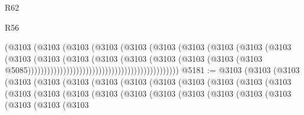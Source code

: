 \begin{lexlean}{R62}
\begin{lexlean}{R56}
\begin{coremodule}
{{{{{{{{{{{{{{{{{{{{{{{{{{{{{{{{{{{{{{{{{{{{{{{{{{{{{{{{{{{{{{{{{{{{{{{{{{{{{{{{{{{{{{{{{{{{{{{{{{{{{{{{{{{{{{{{{{{{{{{{{{{{{{{{{{{{{{{{{{{{{{{{{{{{{{{{{{{{{{{{{{{{{{{{{{{{{{{{{{{{{{{{{{{{{{{{{{{{{{{{{{{{{{{{{{{                                                            (@3103
                                                              (@3103
                                                                (@3103
                                                                  (@3103
                                                                    (@3103
                                                                      (@3103
                                                                        (@3103
                                                                          (@3103
                                                                            (@3103
                                                                              (@3103
                                                                                (@3103
                                                                                  (@3103
                                                                                    (@3103
                                                                                      (@3103
                                                                                        (@3103
                                                                                          (@3103
                                                                                            (@3103
                                                                                              (@3103
                                                                                                (@3103
                                                                                                  @5085)))))))))))))))))))))))))))))))))))))))))))))))
@5181 := @3103
    (@3103
      (@3103
        (@3103
          (@3103
            (@3103
              (@3103
                (@3103
                  (@3103
                    (@3103
                      (@3103
                        (@3103
                          (@3103
                            (@3103
                              (@3103
                                (@3103
                                  (@3103
                                    (@3103
                                      (@3103
                                        (@3103
                                          (@3103
                                            (@3103
                                              (@3103
                                                (@3103
                                                  (@3103
                                                    (@3103
}}}}}}}}}}}}}}}}}}}}}}}}}}}}}}}}}}}}}}}}}}}}}}}}}}}}}}}}}}}}}}}}}}}}}}}}}}}}}}}}}}}}}}}}}}}}}}}}}}}}}}}}}}}}}}}}}}}}}}}}}}}}}}}}}}}}}}}}}}}}}}}}}}}}}}}}}}}}}}}}}}}}}}}}}}}}}}}}}}}}}}}}}}}}}}}}}}}}}}}}}}}}}}}}}}}
\end{coremodule}
\end{lexlean}
\end{lexlean}

